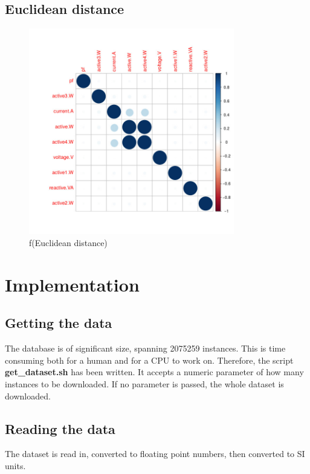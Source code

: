 \documentclass[11pt]{article}
\newcommand{\code}[1]{\textbf{#1}}
\newcommand{\para}[0]{\par\vspace{0.5cm}}
\begin{document}
\subsection{Euclidean distance}

\begin{figure}[!htp]
  \centering
    \includegraphics[width=0.8\textwidth]{img/euclid}
    \caption{f(Euclidean distance)}
\end{figure}
\para

\section{Implementation}
\subsection{Getting the data}
The database is of significant size, spanning 2075259 instances.
This is time consuming both for a human and for a CPU to work on.
Therefore, the script \code{get\_dataset.sh} has been written.
It accepts a numeric parameter of how many instances to be downloaded.
If no parameter is passed, the whole dataset is downloaded.

\subsection{Reading the data}
The dataset is read in, converted to floating point numbers, then converted to SI units.
\end{document}
